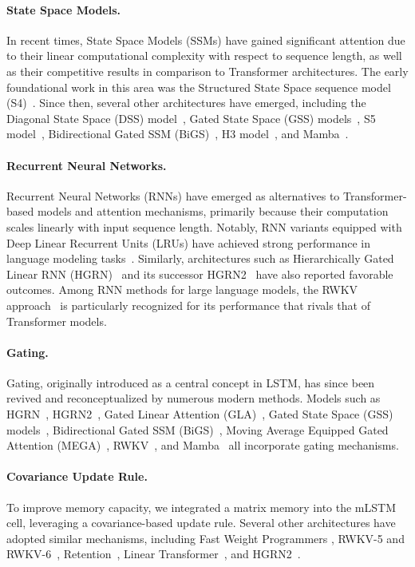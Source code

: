 \paragraph{State Space Models.} In recent times, State Space Models (SSMs) have gained significant attention due to their linear computational complexity with respect to sequence length, as well as their competitive results in comparison to Transformer architectures. The early foundational work in this area was the Structured State Space sequence model (S4)~\citep{Gu:21}. Since then, several other architectures have emerged, including the Diagonal State Space (DSS) model~\citep{Gupta:22}, Gated State Space (GSS) models~\citep{Mehta:22}, S5 model~\citep{Smith:22}, Bidirectional Gated SSM (BiGS)~\citep{Wang:22}, H3 model~\citep{Fu:23}, and Mamba~\citep{Gu:24arxiv}.

\paragraph{Recurrent Neural Networks.} Recurrent Neural Networks (RNNs) have emerged as alternatives to Transformer-based models and attention mechanisms, primarily because their computation scales linearly with input sequence length. Notably, RNN variants equipped with Deep Linear Recurrent Units (LRUs) have achieved strong performance in language modeling tasks~\citep{Orvieto:23, De:24arxiv}. Similarly, architectures such as Hierarchically Gated Linear RNN (HGRN)~\citep{Qin:23} and its successor HGRN2~\citep{Qin:24arxiv} have also reported favorable outcomes. Among RNN methods for large language models, the RWKV approach~\citep{Peng:23arxivshort,Peng:24arxivshort} is particularly recognized for its performance that rivals that of Transformer models.

\paragraph{Gating.}
Gating, originally introduced as a central concept in LSTM, has since been revived and reconceptualized by numerous modern methods. Models such as HGRN~\citep{Qin:23}, HGRN2~\citep{Qin:24arxiv}, Gated Linear Attention (GLA)~\citep{Yang:23arxiv}, Gated State Space (GSS) models~\citep{Mehta:22}, Bidirectional Gated SSM (BiGS)~\citep{Wang:22}, Moving Average Equipped Gated Attention (MEGA)~\citep{Ma:22}, RWKV~\citep{Peng:23arxivshort}, and Mamba~\citep{Gu:24arxiv} all incorporate gating mechanisms.

\paragraph{Covariance Update Rule.} To improve memory capacity, we integrated a matrix memory into the mLSTM cell, leveraging a covariance-based update rule. Several other architectures have adopted similar mechanisms, including Fast Weight Programmers \citep{Schmidhuber:92ncfastweights,Schlag:21}, RWKV-5 and RWKV-6~\citep{Peng:24arxivshort}, Retention~\citep{Sun:23arxiv}, Linear Transformer~\citep{Katharopoulos:20}, and HGRN2~\citep{Qin:24arxiv}.


